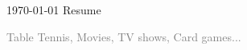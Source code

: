 \documentclass[11pt, a4paper]{awesome-cv}
\begin{document}
\makecvheader[L]

\makecvfooter
  {\today}
  {Resume}
  {\thepage}





\newpage




\textcolor{gray}{ Table Tennis, Movies, TV shows, Card games...}
      



\end{document}
